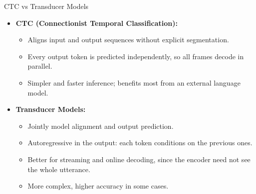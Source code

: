 \begin{frame}{CTC vs Transducer Models}
    \begin{itemize}
        \setlength{\itemsep}{1em}
        \item \textbf{CTC (Connectionist Temporal Classification):}
        \begin{itemize}
            \item Aligns input and output sequences without explicit segmentation.
            \item Every output token is predicted independently, so all frames decode in parallel.
            \item Simpler and faster inference; benefits most from an external language model.
        \end{itemize}
        \item \textbf{Transducer Models:}
        \begin{itemize}
            \item Jointly model alignment and output prediction.
            \item Autoregressive in the output: each token conditions on the previous ones.
            \item Better for streaming and online decoding, since the encoder need not see the whole utterance.
            \item More complex, higher accuracy in some cases.
        \end{itemize}
    \end{itemize}
\end{frame}

